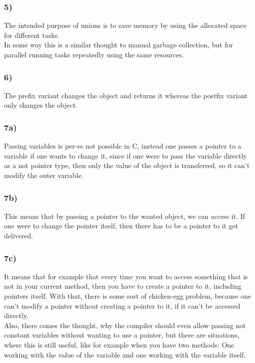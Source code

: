 \documentclass[12pt, a4paper]{article}
\begin{document}
\subsubsection*{5)}
The intended purpose of unions is to save memory by using the allocated space for different tasks. \\
In some way this is a similar thought to manual garbage collection, but for parallel running tasks repeatedly using the same resources.
\subsubsection*{6)}
The prefix variant changes the object and returns it whereas the postfix variant only changes the object.
\subsubsection*{7a)}
Passing variables is per-se not possible in C, instead one passes a pointer to a variable if one wants to change it, since if one were to pass the variable directly as a not pointer type, then only the value of the object is transferred, so it can't modify the outer variable.
\subsubsection*{7b)}
This means that by passing a pointer to the wanted object, we can access it. If one were to change the pointer itself, then there has to be a pointer to it get delivered.
\subsubsection*{7c)}
It means that for example that every time you want to access something that is not in your current method, then you have to create a pointer to it, including pointers itself. With that, there is some sort of chicken-egg problem, because one can't modify a pointer without creating a pointer to it, if it can't be accessed directly. \\
Also, there comes the thought, why the compiler should even allow passing not constant variables without wanting to use a pointer, but there are situations, where this is still useful, like for example when you have two methods: One working with the value of the variable and one working with the variable itself.
\end{document}
